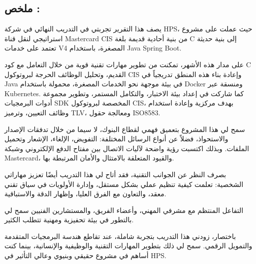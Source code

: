 \documentclass[12pt,a4paper]{report}
\begin{document}
\begin{RTL}
\section{ ملخص :}
{\arabicfont

يصف هذا التقرير تجربتي في التدريب النهائي في شركة HPS، حيث عملت على مشروع استراتيجي لنقل قناة Mastercard CIS من بنية أحادية قديمة بلغة C إلى بنية حديثة تعتمد على خدمات V4 المصغرة، باستخدام Java Spring Boot.

على مدار هذه الأشهر، تمكنت من تطوير مهارات تقنية قوية من خلال التعامل مع كود C القديم، وتحليل الوظائف الحرجة لبروتوكول CIS وإعادة بناء هذه المنطق تدريجياً في Java في بيئة موجهة نحو الخدمات المصغرة، محمولة باستخدام Docker ومنسقة عبر Kubernetes. كما شاركت في إعداد بيئة الاختبار، والتكامل المستمر، وتطوير مجموعة أدوات البرمجيات SDK المخصصة لبروتوكول CIS، بهدف مركزية وإعادة استخدام وظائف التعيين، وترميز TLV، ومعالجة حقول ISO8583.

سمح لي هذا المشروع بتعميق فهمي لقطاع البنوك، لا سيما من خلال تدفقات الإصدار والاستحواذ، فضلاً عن أنواع الرسائل المختلفة: التفويض، الإلغاء، الإشعار وتحميل الملفات. وبذلك اكتسبت رؤية واضحة لآليات الاتصال بين مفتاح الدفع الإلكتروني وشبكة Mastercard، والقيود المتعلقة بالامتثال والأمان المرتبطة بها.

بصرف النظر عن الجوانب التقنية، فقد أتاح لي هذا التدريب أيضًا تعزيز مهاراتي الشخصية: تعلمت كيفية تنظيم عملي بشكل مستقل، وإدارة الأولويات في سياق تقني معقد، والتعاون مع الفرق العليا، وإظهار الدقة والاستباقية.

التفاعل المنتظم مع مشرفي المهني، وأعضاء الفريق، والمستشارين الفنيين سمح لي بالتطور في بيئة تحفيزية ومهنية تتطلب الكثير.

باختصار، زودني هذا التدريب بتجربة شاملة، عند تقاطع هندسة البرمجيات المتقدمة والتمويل الرقمي. سمح لي ذلك بتطوير المهارات التقنية والوظيفية والإنسانية، بينما كنت أساهم في مشروع حقيقي وبنيوي وعالي التأثير في HPS.

}
\end{RTL}

\clearpage
\end{document}
